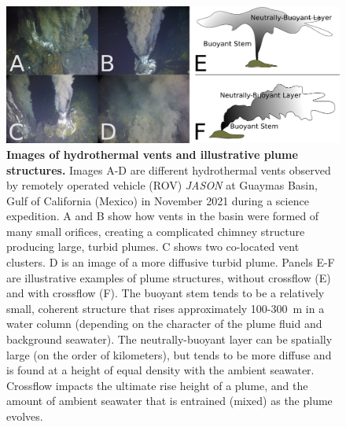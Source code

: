 \begin{figure}[h!]
  \centering
  \includegraphics[width=1\columnwidth]{figures/intro_hydro.png}
  \caption[Images of hydrothermal vents and illustrative plume structures.]{\textbf{Images of hydrothermal vents and illustrative plume structures.} Images A-D are different hydrothermal vents observed by remotely operated vehicle (ROV) \emph{JASON} at Guaymas Basin, Gulf of California (Mexico) in November 2021 during a science expedition. A and B show how vents in the basin were formed of many small orifices, creating a complicated chimney structure producing large, turbid plumes. C shows two co-located vent clusters. D is an image of a more diffusive turbid plume. Panels E-F are illustrative examples of plume structures, without crossflow (E) and with crossflow (F). The buoyant stem tends to be a relatively small, coherent structure that rises approximately 100-\SI{300}{\meter} in a water column (depending on the character of the plume fluid and background seawater). The neutrally-buoyant layer can be spatially large (on the order of kilometers), but tends to be more diffuse and is found at a height of equal density with the ambient seawater. Crossflow impacts the ultimate rise height of a plume, and the amount of ambient seawater that is entrained (mixed) as the plume evolves.}
  \label{fig:intro_hydro}
\end{figure}


